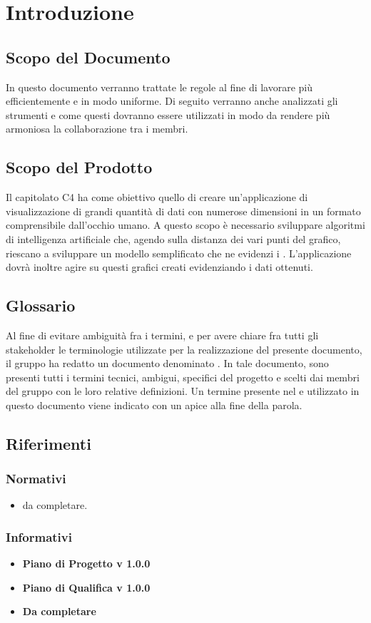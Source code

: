 \section{Introduzione}
\subsection{Scopo del Documento}
In questo documento verranno trattate le regole al fine di lavorare più efficientemente e in modo uniforme.
Di seguito verranno anche analizzati gli strumenti e come questi dovranno essere utilizzati in modo da rendere più armoniosa la collaborazione tra i membri.
\subsection{Scopo del Prodotto}
Il capitolato C4 ha come obiettivo quello di creare un'applicazione di visualizzazione di grandi quantità di dati con numerose dimensioni in un formato comprensibile dall'occhio umano. A questo scopo è necessario sviluppare algoritmi di intelligenza artificiale che, agendo sulla distanza dei vari punti del grafico, riescano a sviluppare un modello semplificato che ne evidenzi i . 
L'applicazione dovrà inoltre agire su questi grafici creati evidenziando i dati ottenuti.
\subsection{Glossario}
Al fine di evitare ambiguità fra i termini, e per avere chiare fra tutti gli stakeholder le terminologie utilizzate per la realizzazione del presente documento, il gruppo \Gruppo{} ha redatto un documento denominato .
In tale documento, sono presenti tutti i termini tecnici, ambigui, specifici del progetto e scelti dai membri del gruppo con le loro relative definizioni.
Un termine presente nel  e utilizzato in questo documento viene indicato con un apice  alla fine della parola.

\subsection{Riferimenti}

\subsubsection{Normativi}
\begin{itemize}
\item da completare.
\end{itemize}

\subsubsection{Informativi}

\begin{itemize}
\item \textbf {Piano di Progetto v 1.0.0}\\

\item \textbf {Piano di Qualifica v 1.0.0}\\

\item \textbf {Da completare}\\

\end{itemize}
